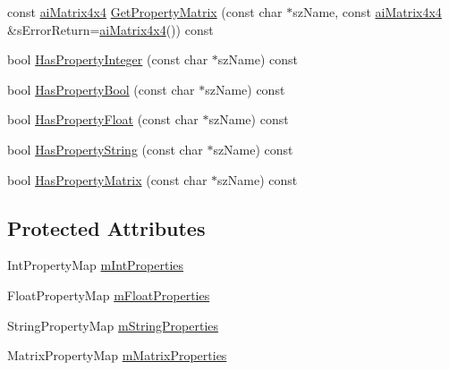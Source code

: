 \begin{DoxyCompactItemize}
\item 
const \hyperlink{structai_matrix4x4}{ai\-Matrix4x4} \hyperlink{class_assimp_1_1_export_properties_a2fa203763a2b7239e440a7d2984dfe1a}{Get\-Property\-Matrix} (const char $\ast$sz\-Name, const \hyperlink{structai_matrix4x4}{ai\-Matrix4x4} \&s\-Error\-Return=\hyperlink{structai_matrix4x4}{ai\-Matrix4x4}()) const 
\item 
bool \hyperlink{class_assimp_1_1_export_properties_a2cbb9fdfb9dbf91a771304efa63ad0f6}{Has\-Property\-Integer} (const char $\ast$sz\-Name) const 
\item 
bool \hyperlink{class_assimp_1_1_export_properties_a00fb337066032140b0201e80b44e06aa}{Has\-Property\-Bool} (const char $\ast$sz\-Name) const 
\item 
bool \hyperlink{class_assimp_1_1_export_properties_a1e58fb2b88d4176d7be6ac6dd5f68381}{Has\-Property\-Float} (const char $\ast$sz\-Name) const 
\item 
bool \hyperlink{class_assimp_1_1_export_properties_ada31f6b8c090efa86b874b246c5ef33d}{Has\-Property\-String} (const char $\ast$sz\-Name) const 
\item 
bool \hyperlink{class_assimp_1_1_export_properties_a58e4691346637542bb02f1ec7190efdb}{Has\-Property\-Matrix} (const char $\ast$sz\-Name) const 
\end{DoxyCompactItemize}
\subsection*{Protected Attributes}
\begin{DoxyCompactItemize}
\item 
Int\-Property\-Map \hyperlink{class_assimp_1_1_export_properties_ad69c0546b1e7faf054240f228cf5f9b6}{m\-Int\-Properties}
\item 
Float\-Property\-Map \hyperlink{class_assimp_1_1_export_properties_acf10a6aec3a1d5cb6f190bebc48ed4c7}{m\-Float\-Properties}
\item 
String\-Property\-Map \hyperlink{class_assimp_1_1_export_properties_aa842acefe6a2b4eb8efff24030850a4f}{m\-String\-Properties}
\item 
Matrix\-Property\-Map \hyperlink{class_assimp_1_1_export_properties_a1c7dc9cd6b7f34a98fdb1a16f37b260f}{m\-Matrix\-Properties}
\end{DoxyCompactItemize}


